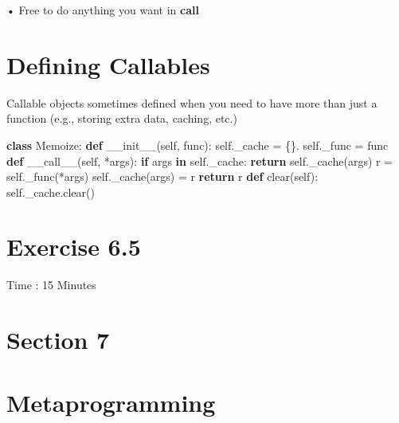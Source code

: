 \documentclass[
  letterpaper,
  DIV=11,
  numbers=noendperiod]{scrreprt}
\newenvironment{Shaded}{\begin{snugshade}}{\end{snugshade}}
\newcommand{\ControlFlowTok}[1]{\textcolor[rgb]{0.00,0.23,0.31}{\textbf{#1}}}
\newcommand{\FunctionTok}[1]{\textcolor[rgb]{0.28,0.35,0.67}{#1}}
\newcommand{\KeywordTok}[1]{\textcolor[rgb]{0.00,0.23,0.31}{\textbf{#1}}}
\newcommand{\NormalTok}[1]{\textcolor[rgb]{0.00,0.23,0.31}{#1}}
\newcommand{\OperatorTok}[1]{\textcolor[rgb]{0.37,0.37,0.37}{#1}}
\newcommand{\VariableTok}[1]{\textcolor[rgb]{0.07,0.07,0.07}{#1}}
\begin{document}
• Free to do anything you want in \textbf{call}


\chapter{Defining Callables}\label{defining-callables}

Callable objects sometimes defined when you need to have more than just
a function (e.g., storing extra data, caching, etc.)

\begin{Shaded}
\begin{Highlighting}[]
\KeywordTok{class}\NormalTok{ Memoize: }\KeywordTok{def} \FunctionTok{\_\_init\_\_}\NormalTok{(}\VariableTok{self}\NormalTok{, func): }\VariableTok{self}\NormalTok{.\_cache }\OperatorTok{=}\NormalTok{ \{\}. }\VariableTok{self}\NormalTok{.\_func }\OperatorTok{=}\NormalTok{ func }\KeywordTok{def} \FunctionTok{\_\_call\_\_}\NormalTok{(}\VariableTok{self}\NormalTok{, }\OperatorTok{*}\NormalTok{args): }\ControlFlowTok{if}\NormalTok{ args }\KeywordTok{in} \VariableTok{self}\NormalTok{.\_cache: }\ControlFlowTok{return} \VariableTok{self}\NormalTok{.\_cache(args) r }\OperatorTok{=} \VariableTok{self}\NormalTok{.\_func(}\OperatorTok{*}\NormalTok{args) }\VariableTok{self}\NormalTok{.\_cache(args) }\OperatorTok{=}\NormalTok{ r }\ControlFlowTok{return}\NormalTok{ r }\KeywordTok{def}\NormalTok{ clear(}\VariableTok{self}\NormalTok{): }\VariableTok{self}\NormalTok{.\_cache.clear() }
\end{Highlighting}
\end{Shaded}


\chapter{Exercise 6.5}\label{exercise-6.5}

Time : 15 Minutes


\chapter{Section 7}\label{section-7}


\chapter{Metaprogramming}\label{metaprogramming}
\end{document}

